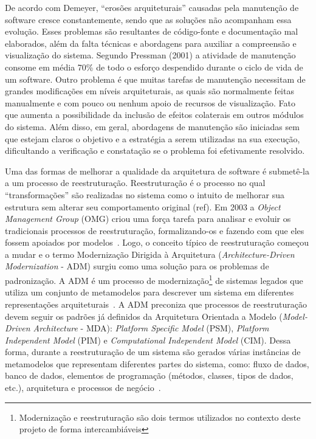 \documentclass[12pt]{article}
\begin{document}
De acordo com Demeyer, ``erosões arquiteturais'' causadas pela manutenção de software cresce constantemente, sendo que as soluções não acompanham essa evolução. Esses problemas são resultantes de código-fonte e documentação mal elaborados, além da falta técnicas e abordagens para auxiliar a compreensão e visualização do sistema. Segundo Pressman (2001) a atividade de manutenção consome em média 70\% de todo o esforço despendido durante o ciclo de vida de um software. Outro problema é que muitas tarefas de manutenção necessitam de grandes modificações em níveis arquiteturais, as quais são normalmente feitas manualmente e com pouco ou nenhum apoio de recursos de visualização. Fato que aumenta a possibilidade da inclusão de efeitos colaterais em outros módulos do sistema. Além disso, em geral, abordagens de manutenção são iniciadas sem que estejam claros o objetivo e a estratégia a serem utilizadas na sua execução, dificultando a verificação e constatação se o problema foi efetivamente resolvido.

Uma das formas de melhorar a qualidade da arquitetura de software é submetê-la a um processo de reestruturação. Reestruturação é o processo no qual ``transformações'' são realizadas no sistema como o intuito de melhorar sua estrutura sem alterar seu comportamento original (ref). Em 2003 a \textit{Object Management Group} (OMG) criou uma força tarefa para analisar e evoluir os tradicionais processos de reestruturação, formalizando-os e fazendo com que eles fossem apoiados por modelos~\cite{OMGADM}. Logo, o conceito típico de reestruturação começou a mudar e o termo Modernização Dirigida à Arquitetura (\textit{Architecture-Driven Modernization} - ADM) surgiu como uma solução para os problemas de padronização. A ADM é um processo de modernização\footnote{Modernização e reestruturação são dois termos utilizados no contexto deste projeto de forma intercambiáveis} de sistemas legados que utiliza um conjunto de metamodelos para descrever um sistema em diferentes representações arquiteturais~\cite{ADM:OMG}. A ADM preconiza que processos de reestruturação devem seguir os padrões já definidos da Arquitetura Orientada a Modelo (\textit{Model-Driven Architecture} - MDA): \textit{Platform Specific Model} (PSM), \textit{Platform Independent Model} (PIM) e \textit{Computational Independent Model} (CIM). Dessa forma, durante a reestruturação de um sistema são gerados várias instâncias de metamodelos que representam diferentes partes do sistema, como: fluxo de dados, banco de dados, elementos de programação (métodos, classes, tipos de dados, etc.), arquitetura e processos de negócio~\cite{Kleppe:2003, PerezCastillo:2011jo}. 
\end{document}
